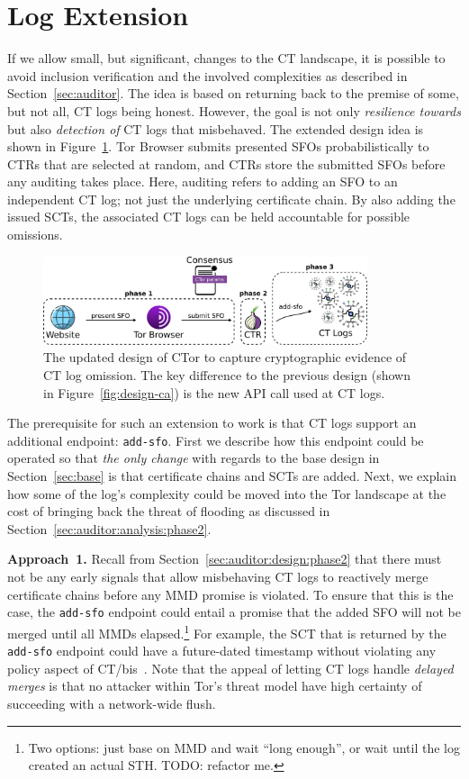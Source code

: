 \section{Log Extension} \label{sec:log}
If we allow small, but significant, changes to the CT landscape, it is possible
to avoid inclusion verification and the involved complexities as described in
Section~\ref{sec:auditor}.  The idea is based on returning back to the premise
of some, but not all, CT logs being honest.  However, the goal is not only
\emph{resilience towards} but also \emph{detection of} CT logs that misbehaved.
The extended design idea is shown in Figure~\ref{fig:ext-log}.  Tor
Browser submits presented SFOs probabilistically to CTRs that are selected
at random, and CTRs store the submitted SFOs before any auditing takes place.
Here, auditing refers to adding an SFO to an independent CT log; not just the
underlying certificate chain.  By also adding the issued SCTs, the associated CT
logs can be held accountable for possible omissions.

\begin{figure}
    \centering
    \includegraphics[width=0.85\textwidth]{img/design-log}
	\caption{The updated design of CTor to capture cryptographic evidence of CT
	log omission. The key difference to the previous design (shown in
	Figure~\ref{fig:design-ca}) is the new API call used at CT logs.}
    \label{fig:ext-log}
\end{figure}

The prerequisite for such an extension to work is that CT logs support an
additional endpoint:
	\texttt{add-sfo}.
First we describe how this endpoint could be operated so that \emph{the only
change} with regards to the base design in Section~\ref{sec:base} is that
certificate chains and SCTs are added.  Next, we explain how some of the log's
complexity could be moved into the Tor landscape at the cost of bringing back
the threat of flooding as discussed in
Section~\ref{sec:auditor:analysis:phase2}.

\textbf{Approach~1.}
Recall from Section~\ref{sec:auditor:design:phase2} that there must not be any
early signals that allow misbehaving CT logs to reactively merge certificate
chains before any MMD promise is violated.  To ensure that this is the case, the
\texttt{add-sfo} endpoint could entail a promise that the added SFO will not be
merged until all MMDs elapsed.\footnote{%
	Two options: just base on MMD and wait ``long enough'', or wait until the
	log created an actual STH.  TODO: refactor me.
} For example, the SCT that is returned by the \texttt{add-sfo} endpoint could
have a future-dated timestamp without violating any policy aspect of
CT/bis~\cite{ct/bis}.  Note that the appeal of letting CT logs handle
\emph{delayed merges} is that no attacker within Tor's threat model have high
certainty of succeeding with a network-wide flush.

